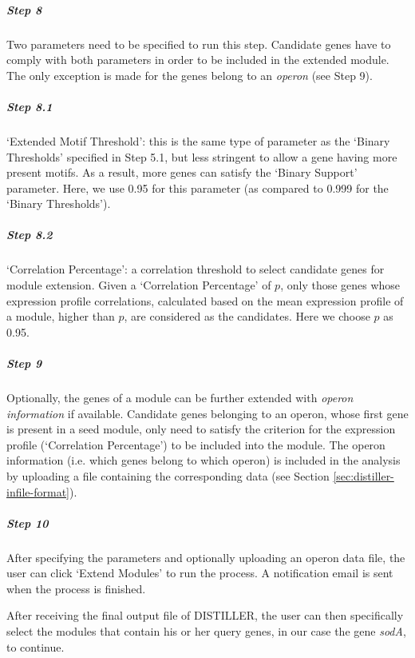 \begin{small} %

\subparagraph{Step 8} Two parameters need to be specified to run this 
step. Candidate genes have to comply with both parameters in order to be
included in the extended module. The only exception is made for the genes
belong to an \textit{operon} (see Step 9).

\subparagraph{Step 8.1} `Extended Motif Threshold': this is the same type of 
parameter as the `Binary Thresholds' specified in Step 5.1, but less stringent
to allow a gene having more present motifs.
%
As a result, more genes can satisfy the `Binary Support' parameter.  Here, we
use 0.95 for this parameter (as compared to 0.999 for the `Binary
Thresholds').

\subparagraph{Step 8.2}	`Correlation Percentage': a correlation threshold to 
select candidate genes for module extension.  Given a `Correlation Percentage'
of $p$, only those genes whose expression profile correlations, calculated
based on the mean expression profile of a module, higher than $p$, are
considered as the candidates. Here we choose $p$ as 0.95.


\subparagraph{Step 9} Optionally, the genes of a module can be further 
extended with \textit{operon information} if available.  Candidate genes
belonging to an operon, whose first gene is present in a seed module, only
need to satisfy the criterion for the expression profile (`Correlation
Percentage') to be included into the module.  
%
The operon information (i.e. which genes belong to which operon) is included
in the analysis by uploading a file containing the corresponding data (see
Section \ref{sec:distiller-infile-format}).

\subparagraph{Step 10} After specifying the parameters and optionally 
uploading an operon data file, the user can click `Extend Modules' to run the
process.  A notification email is sent when the process is finished.

\end{small} %

After receiving the final output file of DISTILLER, the user can then
specifically select the modules that contain his or her query genes, in our
case the gene \textit{sodA}, to continue.



